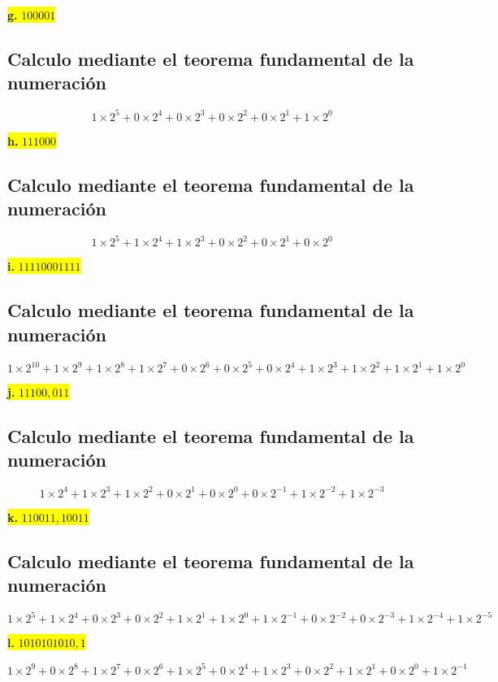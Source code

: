 \documentclass[a4paper,12pt]{article}
\begin{document}
	\begin{center}
		\colorbox{yellow}{{\textbf{g.} $100001$}}
		\subsection*{Calculo mediante el teorema fundamental de la numeración}
		\[
		1\times2^{5} + 0\times2^{4} + 0\times2^{3} + 0\times2^{2} + 0\times2^{1} + 1\times2^{0}
		\]
	\end{center}
	\begin{center}
		\colorbox{yellow}{{\textbf{h.} $111000$}}
		\subsection*{Calculo mediante el teorema fundamental de la numeración}
		\[
		1\times2^{5} + 1\times2^{4} + 1\times2^{3} + 0\times2^{2} + 0\times2^{1} + 0\times2^{0}
		\]
	\end{center}
	\begin{center}
		\colorbox{yellow}{{\textbf{i.} $11110001111$}}
		\subsection*{Calculo mediante el teorema fundamental de la numeración}
		\[
		1\times2^{10} + 1\times2^{9} + 1\times2^{8} + 1\times2^{7} + 0\times2^{6} + 0\times2^{5} + 0\times2^{4} + 1\times2^{3} + 1\times2^{2} + 1\times2^{1} + 1\times2^{0}
		\]
	\end{center}
	\begin{center}
		\colorbox{yellow}{{\textbf{j.} $11100,011$}}
		\subsection*{Calculo mediante el teorema fundamental de la numeración}
		\[
		1\times2^{4} + 1\times2^{3} + 1\times2^{2} + 0\times2^{1} + 0\times2^{0} + 0\times2^{-1} + 1\times2^{-2} + 1\times2^{-3} 
		\]
	\end{center}
	\begin{center}
		\colorbox{yellow}{{\textbf{k.} $110011,10011$}}
		\subsection*{Calculo mediante el teorema fundamental de la numeración}
		\[
		1\times2^{5} + 1\times2^{4} + 0\times2^{3} + 0\times2^{2} + 1\times2^{1} + 1\times2^{0} + 1\times2^{-1} + 0\times2^{-2} + 0\times2^{-3} + 1\times2^{-4} + 1\times2^{-5}
		\]
	\end{center}
	\begin{center}
		\colorbox{yellow}{{\textbf{l.} $1010101010,1$}}
	
		\[
		1\times2^{9} + 0\times2^{8} + 1\times2^{7} + 0\times2^{6} + 1\times2^{5} + 0\times2^{4} + 1\times2^{3} + 0\times2^{2} + 1\times2^{1} + 0\times2^{0} + 1\times2^{-1}
		\]
	\end{center}
\end{document}

